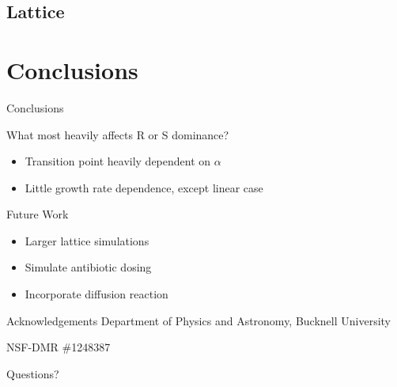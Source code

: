 \documentclass[10pt, notes]{beamer}       %
\begin{document}
\subsection{Lattice}


\section{Conclusions}
\begin{frame}{Conclusions}
  \begin{alertblock}{What most heavily affects R or S dominance?}
    \begin{itemize}
      \item Transition point heavily dependent on $\alpha$
      \item Little growth rate dependence, except linear case
    \end{itemize}
  \end{alertblock}

\end{frame}

\begin{frame}{Future Work}
  \begin{itemize}
    \item Larger lattice simulations
    \item Simulate antibiotic dosing
    \item Incorporate diffusion reaction
  \end{itemize}

\end{frame}

\begin{frame}{Acknowledgements}
Department of Physics and Astronomy, Bucknell University

NSF-DMR \#1248387

\vfill
\end{frame}

\begin{frame}[standout]
  Questions?
\end{frame}


\appendix
\end{document}
